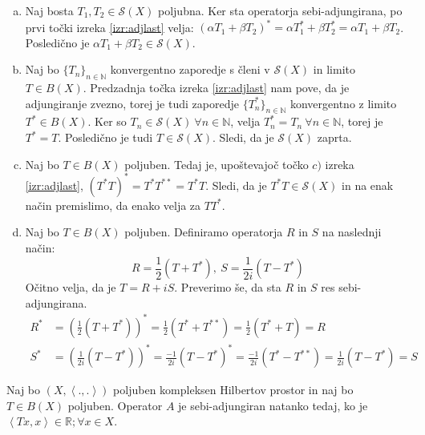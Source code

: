 \documentclass[mat2]{matdelo}
\newcommand{\R}{\mathbb{R}}
\newcommand{\N}{\mathbb{N}}
\newcommand{\Sp}[2]{\ensuremath{\left<#1, #2\right>}}
\begin{document}
			\begin{dokaz}
				\begin{enumerate}[a)]
					\item Naj bosta $T_1, T_2 \in \mathcal{S}(X)$ poljubna. Ker sta operatorja sebi-adjungirana, po prvi točki izreka \ref{izr:adjlast} velja: $(\alpha T_1 + \beta T_2)^* = \alpha T_1^* + \beta T_2^* = \alpha T_1 + \beta T_2$. Posledično je $\alpha T_1 + \beta T_2 \in \mathcal{S}(X)$.
					\item Naj bo $\{T_n\}_{n\in\N}$ konvergentno zaporedje s členi v $\mathcal{S}(X)$ in limito $T\in B(X)$. Predzadnja točka izreka \ref{izr:adjlast} nam pove, da je adjungiranje zvezno, torej je tudi zaporedje $\{T_n^*\}_{n\in\N}$ konvergentno z limito $T^* \in B(X)$. Ker so $T_n \in \mathcal{S}(X)~ \forall n\in \N$, velja $T_n^* = T_n~\forall n\in \N$, torej je $T^* = T$. Posledično je tudi $T\in \mathcal{S}(X)$. Sledi, da je $\mathcal{S}(X)$ zaprta.
					\item Naj bo $T\in B(X)$ poljuben. Tedaj je, upoštevajoč točko $c)$ izreka \ref{izr:adjlast}, $(T^*T)^* = T^*T^{**} = T^*T$. Sledi, da je $T^*T\in \mathcal{S}(X)$ in na enak način premislimo, da enako velja za $TT^*$.
					\item Naj bo $T\in B(X)$ poljuben. Definiramo operatorja $R$ in $S$ na naslednji način: $$R = \frac{1}{2}(T + T^*),~ S=\frac{1}{2i}(T - T^*)$$
					Očitno velja, da je $T = R + iS$. Preverimo še, da sta $R$ in $S$ res sebi-adjungirana.
					\begin{align*}
						R^* &= (\frac{1}{2}(T + T^*))^* = \frac{1}{2}(T^* + T^{**}) = \frac{1}{2}(T^* + T) = R \\
						S^* &= (\frac{1}{2i}(T - T^*))^* = \frac{-1}{2i}(T - T^*)^* = \frac{-1}{2i}(T^* - T^{**}) =\frac{1}{2i}(T - T^*) = S
					\end{align*}
				\end{enumerate}
			\end{dokaz}
			
			\begin{trditev}
				\label{trd:sebiadjop}
				Naj bo $(X, \Sp{.}{.})$ poljuben kompleksen Hilbertov prostor in naj bo $T\in B(X)$ poljuben. Operator $A$ je sebi-adjungiran natanko tedaj, ko je $\Sp{Tx}{x}\in\R;\forall x\in X$.
			\end{trditev}
			
\end{document}
